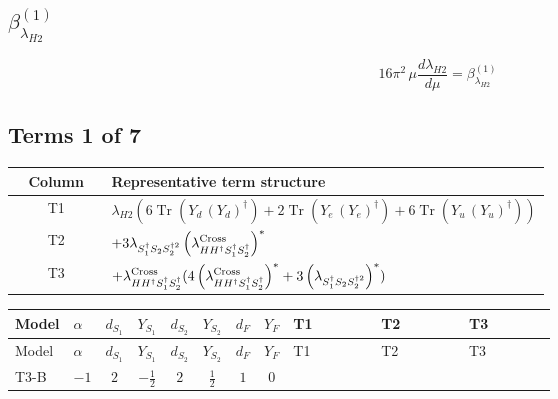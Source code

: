 \documentclass[8pt]{article}
\begin{document}
\begin{landscape}
\section*{$\beta_{\lambda_{H2}}^{(1)}$}
\[16\pi^2\,\mu\frac{d \lambda_{H2}}{d\mu}=\beta_{\lambda_{H2}}^{(1)}\]
\subsection*{Terms 1 of 7}
\begin{center}
\begin{tabular}{@{}c >{\raggedright\arraybackslash}p{0.82\linewidth}@{}}
\toprule
Column & Representative term structure \\
\midrule
T1 & \(\displaystyle {\lambda_{H2}} (6 \operatorname{Tr}\!\left({Y_d}\,\left({Y_d}\right)^{\dagger}\right)+2 \operatorname{Tr}\!\left({Y_e}\,\left({Y_e}\right)^{\dagger}\right)+6 \operatorname{Tr}\!\left({Y_u}\,\left({Y_u}\right)^{\dagger}\right))\) \\
\midrule
T2 & \(\displaystyle +3 {\lambda_{S_1^\dagger S_2 S_2^{\dagger 2}}} \left({\lambda_{H H^\dagger S_1^\dagger S_2^\dagger}^{\rm Cross}}\right)^{*}\) \\
\midrule
T3 & \(\displaystyle +{\lambda_{H H^\dagger S_1^\dagger S_2^\dagger}^{\rm Cross}} (4 \left({\lambda_{H H^\dagger S_1^\dagger S_2^\dagger}^{\rm Cross}}\right)^{*}+3 \left({\lambda_{S_1^\dagger S_2 S_2^{\dagger 2}}}\right)^{*})\) \\
\midrule
\bottomrule
\end{tabular}
\end{center}
\smallskip
\tiny
\begin{longtable}{@{}llcccccc >{\raggedright\arraybackslash}p{0.21\linewidth} >{\raggedright\arraybackslash}p{0.21\linewidth} >{\raggedright\arraybackslash}p{0.21\linewidth}@{}}
\toprule
Model & $\alpha$ & $d_{S_1}$ & $Y_{S_1}$ & $d_{S_2}$ & $Y_{S_2}$ & $d_F$ & $Y_F$ & T1 & T2 & T3 \\
\midrule
\endfirsthead
\toprule
Model & $\alpha$ & $d_{S_1}$ & $Y_{S_1}$ & $d_{S_2}$ & $Y_{S_2}$ & $d_F$ & $Y_F$ & T1 & T2 & T3 \\
\midrule
\endhead
T3-B & $-1$ & $2$ & $-\frac{1}{2}$ & $2$ & $\frac{1}{2}$ & $1$ & $0$ & \scriptsize\adjustbox{max width=\linewidth}{$\begin{gathered} {\lambda_{H2}} (6 \operatorname{Tr}\!\left({Y_d}\,\left({Y_d}\right)^{\dagger}\right)+2 \operatorname{Tr}\!\left({Y_e}\,\left({Y_e}\right)^{\dagger}\right)+6 \operatorname{Tr}\!\left({Y_u}\,\left({Y_u}\right)^{\dagger}\right))\end{gathered}$} & \scriptsize\adjustbox{max width=\linewidth}{$\begin{gathered} +3 {\lambda_{S_1^\dagger S_2 S_2^{\dagger 2}}} \left({\lambda_{H H^\dagger S_1^\dagger S_2^\dagger}^{\rm Cross}}\right)^{*}\end{gathered}$} & \scriptsize\adjustbox{max width=\linewidth}{$\begin{gathered} +{\lambda_{H H^\dagger S_1^\dagger S_2^\dagger}^{\rm Cross}} (4 \left({\lambda_{H H^\dagger S_1^\dagger S_2^\dagger}^{\rm Cross}}\right)^{*}+3 \left({\lambda_{S_1^\dagger S_2 S_2^{\dagger 2}}}\right)^{*})\end{gathered}$} \\

\end{longtable}
\end{landscape}
\end{document}

